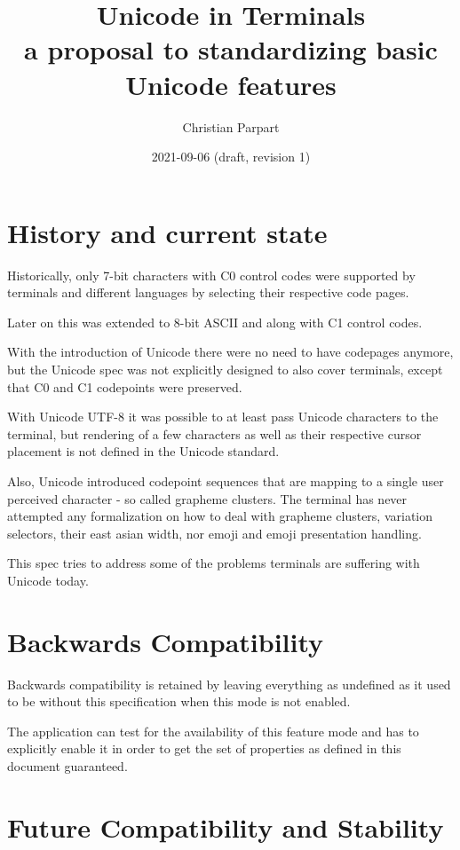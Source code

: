 \documentclass{article}
\title{Unicode in Terminals \\
a proposal to standardizing basic Unicode features}
\author{Christian Parpart}
\date{2021-09-06 (draft, revision 1)}
\begin{document}
\maketitle

\tableofcontents

\section{History and current state}

Historically, only 7-bit characters with C0 control codes
were supported by terminals and different languages
by selecting their respective code pages.

Later on this was extended to 8-bit ASCII and along with C1 control codes.

With the introduction of Unicode there were no need to have codepages anymore,
but the Unicode spec was not explicitly designed to also cover terminals,
except that C0 and C1 codepoints were preserved.

With Unicode UTF-8 it was possible to at least pass Unicode characters to the
terminal, but rendering of a few characters as well as their respective
cursor placement is not defined in the Unicode standard.

Also, Unicode introduced codepoint sequences that are mapping to
a single user perceived character - so called grapheme clusters.
The terminal has never attempted any formalization on how to deal with
grapheme clusters, variation selectors, their east asian width, nor
emoji and emoji presentation handling.

This spec tries to address some of the problems terminals are suffering
with Unicode today.

\section{Backwards Compatibility}

Backwards compatibility is retained by leaving everything as undefined
as it used to be without this specification when this mode is not enabled.

The application can test for the availability of this feature mode
and has to explicitly enable it in order to get the set of properties
as defined in this document guaranteed.

\section{Future Compatibility and Stability}
\end{document}
